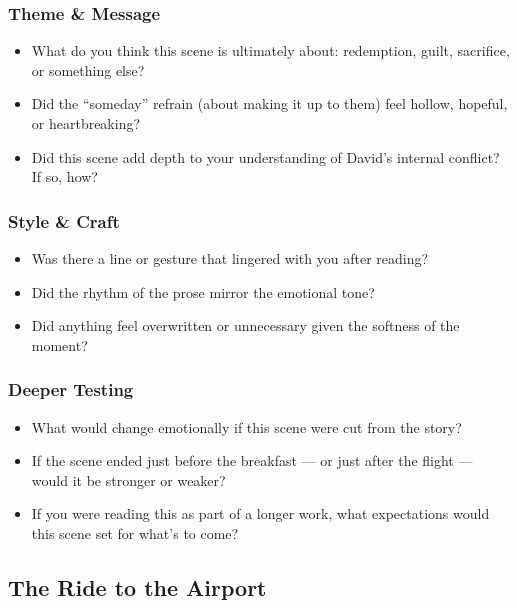 \subsubsection{Theme \& Message}

\begin{itemize}
  \item What do you think this scene is ultimately about: redemption, guilt, sacrifice, or something else?
  \item Did the “someday” refrain (about making it up to them) feel hollow, hopeful, or heartbreaking?
  \item Did this scene add depth to your understanding of David’s internal conflict? If so, how?
\end{itemize}

\subsubsection{Style \& Craft}

\begin{itemize}
  \item Was there a line or gesture that lingered with you after reading?
  \item Did the rhythm of the prose mirror the emotional tone?
  \item Did anything feel overwritten or unnecessary given the softness of the moment?
\end{itemize}

\subsubsection{Deeper Testing}

\begin{itemize}
  \item What would change emotionally if this scene were cut from the story?
  \item If the scene ended just before the breakfast — or just after the flight — would it be stronger or weaker?
  \item If you were reading this as part of a longer work, what expectations would this scene set for what’s to come?
\end{itemize}











\subsection{The Ride to the Airport}

